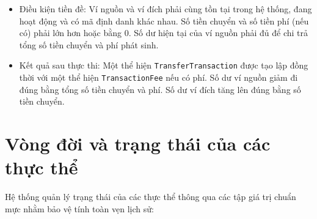 \documentclass[a4paper,12pt]{report}
\providecommand{\tightlist}{%
  \setlength{\itemsep}{0pt}\setlength{\parskip}{0pt}}
\newcommand{\passthrough}[1]{#1}
\begin{document}
\begin{itemize}
\tightlist
\item
  Điều kiện tiền đề: Ví nguồn và ví đích phải cùng tồn tại trong hệ
  thống, đang hoạt động và có mã định danh khác nhau. Số tiền chuyển và
  số tiền phí (nếu có) phải lớn hơn hoặc bằng 0. Số dư hiện tại của ví
  nguồn phải đủ để chi trả tổng số tiền chuyển và phí phát sinh.
\item
  Kết quả sau thực thi: Một thể hiện
  \passthrough{\lstinline!TransferTransaction!} được tạo lập đồng thời
  với một thể hiện \passthrough{\lstinline!TransactionFee!} nếu có phí.
  Số dư ví nguồn giảm đi đúng bằng tổng số tiền chuyển và phí. Số dư ví
  đích tăng lên đúng bằng số tiền chuyển.
\end{itemize}

\section{Vòng đời và trạng thái của các thực
thể}\label{vuxf2ng-ux111ux1eddi-vuxe0-trux1ea1ng-thuxe1i-cux1ee7a-cuxe1c-thux1ef1c-thux1ec3}

Hệ thống quản lý trạng thái của các thực thể thông qua các tập giá trị
chuẩn mực nhằm bảo vệ tính toàn vẹn lịch sử:
\end{document}
